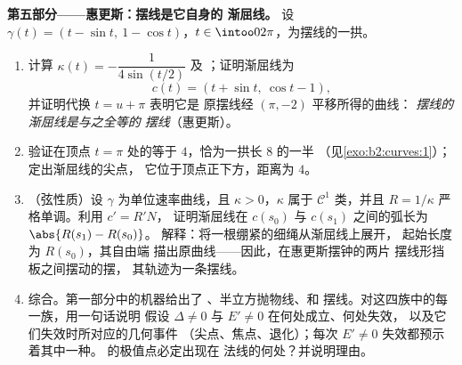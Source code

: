 \begin{problem}
\medskip
\noindent\textbf{第五部分——惠更斯：摆线是它自身的
渐屈线。} 设 $\gamma(t) = (t - \sin t,\ 1 - \cos t)$，$t \in
\intoo0{2\pi}$，为摆线的一拱。
\begin{enumerate}[resume]
  \item 计算 $\kappa(t) = -\dfrac1{4\sin(t/2)}$ 及
        ；证明渐屈线为
        \[
        c(t) = (t + \sin t,\ \cos t - 1),
        \]
        并证明代换 $t = u + \pi$ 表明它是
        原摆线经 $(\pi, -2)$ 平移所得的曲线：
        \emph{摆线的渐屈线是与之全等的
        摆线}（惠更斯）。
  \item 验证在顶点 $t =
        \pi$ 处的等于 $4$，恰为一拱长 $8$ 的一半
        （见\cref{exo:b2:curves:1}）；定出渐屈线的尖点，
        它位于顶点正下方，距离为 $4$。
  \item （弦性质）设 $\gamma$ 为单位速率曲线，且
        $\kappa > 0$，$\kappa$ 属于 $\mathcal C^1$ 类，并且
        $R = 1/\kappa$ 严格单调。利用 $c' = R'N$，
        证明渐屈线在
        $c(s_0)$ 与 $c(s_1)$ 之间的弧长为 $\abs{R(s_1) - R(s_0)}$。
        解释：将一根绷紧的细绳从渐屈线上展开，
        起始长度为 $R(s_0)$，其自由端
        描出原曲线——因此，在惠更斯摆钟的两片
        摆线形挡板之间摆动的摆，
        其轨迹为一条摆线。
  \item 综合。第一部分中的机器给出了
        、半立方抛物线、和
        摆线。对这四族中的每一族，用一句话说明
        假设 $\Delta \neq 0$ 与 $E' \neq 0$ 在何处成立、何处失效，
        以及它们失效时所对应的几何事件
        （尖点、焦点、退化）；每次 $E' \neq 0$ 失效都预示着其中一种。
        的极值点必定出现在
        法线的何处？并说明理由。
\end{enumerate}
\end{problem}
